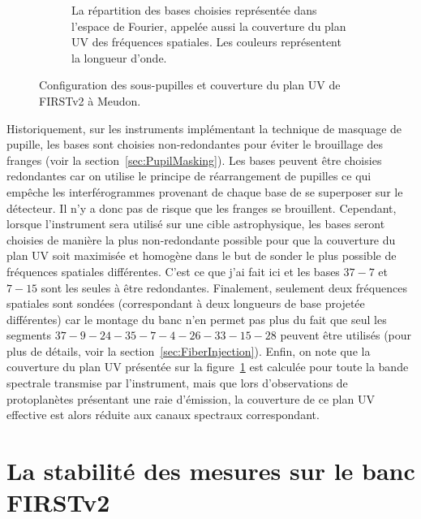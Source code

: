 \begin{figure}[ht!]
\begin{subfigure}{0.6\textwidth}
        \caption{La répartition des bases choisies représentée dans l'espace de Fourier, appelée aussi la couverture du plan UV des fréquences spatiales. Les couleurs représentent la longueur d'onde.}
        \label{fig:SegUVSimuleB}
    \end{subfigure}
    \caption[Configuration des sous-pupilles et couverture du plan UV de FIRSTv2 à Meudon.]{Configuration des sous-pupilles et couverture du plan UV de FIRSTv2 à Meudon.}
    \label{fig:SegUVSimule}
\end{figure}

Historiquement, sur les instruments implémentant la technique de masquage de pupille, les bases sont choisies non-redondantes pour éviter le brouillage des franges (voir la section~\ref{sec:PupilMasking}). Les bases peuvent être choisies redondantes car on utilise le principe de réarrangement de pupilles ce qui empêche les interférogrammes provenant de chaque base de se superposer sur le détecteur. Il n'y a donc pas de risque que les franges se brouillent. Cependant, lorsque l'instrument sera utilisé sur une cible astrophysique, les bases seront choisies de manière la plus non-redondante possible pour que la couverture du plan UV soit maximisée et homogène dans le but de sonder le plus possible de fréquences spatiales différentes. C'est ce que j'ai fait ici et les bases $37-7$ et $7-15$ sont les seules à être redondantes. Finalement, seulement deux fréquences spatiales sont sondées (correspondant à deux longueurs de base projetée différentes) car le montage du banc n'en permet pas plus du fait que seul les segments $37 - 9 - 24 - 35 - 7 - 4 - 26 - 33 - 15 - 28$ peuvent être utilisés (pour plus de détails, voir la section~\ref{sec:FiberInjection}). Enfin, on note que la couverture du plan UV présentée sur la figure~\ref{fig:SegUVSimuleB} est calculée pour toute la bande spectrale transmise par l'instrument, mais que lors d'observations de protoplanètes présentant une raie d'émission, la couverture de ce plan UV effective est alors réduite aux canaux spectraux correspondant.


\section{La stabilité des mesures sur le banc FIRSTv2}

